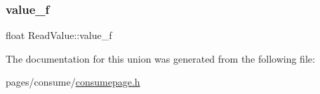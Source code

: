 \mbox{\label{union_read_value_aaf8c28a424fb6f23198e7a18b87785c9}} 
\subsubsection{\texorpdfstring{value\_f}{value\_f}}
{\footnotesize\ttfamily float Read\+Value\+::value\+\_\+f}



The documentation for this union was generated from the following file\+:\begin{DoxyCompactItemize}
\item 
pages/consume/\mbox{\hyperlink{consumepage_8h}{consumepage.\+h}}\end{DoxyCompactItemize}
